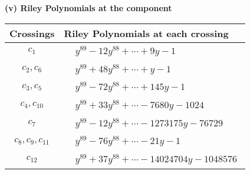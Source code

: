 \documentclass[1p]{elsarticle_modified}
\theoremstyle{definition}
\begin{document}
\newpage\renewcommand{\arraystretch}{1}
\flushleft \textbf{(v) Riley Polynomials at the component}\newline \\
\begin{tabular}{m{50pt}|m{274pt}}
Crossings & \hspace{64pt}Riley Polynomials at each crossing \\
\hline $$\begin{aligned}c_{1}\end{aligned}$$&$\begin{aligned}
&y^{89}-12 y^{88}+\cdots+9 y-1
\end{aligned}$\\
\hline $$\begin{aligned}c_{2},c_{6}\end{aligned}$$&$\begin{aligned}
&y^{89}+48 y^{88}+\cdots+y-1
\end{aligned}$\\
\hline $$\begin{aligned}c_{3},c_{5}\end{aligned}$$&$\begin{aligned}
&y^{89}-72 y^{88}+\cdots+145 y-1
\end{aligned}$\\
\hline $$\begin{aligned}c_{4},c_{10}\end{aligned}$$&$\begin{aligned}
&y^{89}+33 y^{88}+\cdots-7680 y-1024
\end{aligned}$\\
\hline $$\begin{aligned}c_{7}\end{aligned}$$&$\begin{aligned}
&y^{89}-12 y^{88}+\cdots-1273175 y-76729
\end{aligned}$\\
\hline $$\begin{aligned}c_{8},c_{9},c_{11}\end{aligned}$$&$\begin{aligned}
&y^{89}-76 y^{88}+\cdots-21 y-1
\end{aligned}$\\
\hline $$\begin{aligned}c_{12}\end{aligned}$$&$\begin{aligned}
&y^{89}+37 y^{88}+\cdots-14024704 y-1048576
\end{aligned}$\\
\hline
\end{tabular}\\~\\
\end{document}
